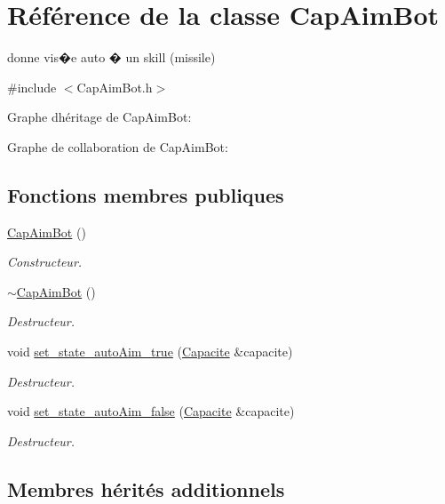 \hypertarget{class_cap_aim_bot}{}\section{Référence de la classe Cap\+Aim\+Bot}
\label{class_cap_aim_bot}


donne vis�e auto � un skill (missile)  




{\ttfamily \#include $<$Cap\+Aim\+Bot.\+h$>$}



Graphe d\textquotesingle{}héritage de Cap\+Aim\+Bot\+:


Graphe de collaboration de Cap\+Aim\+Bot\+:
\subsection*{Fonctions membres publiques}
\begin{DoxyCompactItemize}
\item 
\hyperlink{class_cap_aim_bot_ac80621e5512e382cde343c483f74c90e}{Cap\+Aim\+Bot} ()
\begin{DoxyCompactList}\small\item\em Constructeur. \end{DoxyCompactList}\item 
\hyperlink{class_cap_aim_bot_ac7deb20ca65868d6c752f137cbaea339}{$\sim$\+Cap\+Aim\+Bot} ()
\begin{DoxyCompactList}\small\item\em Destructeur. \end{DoxyCompactList}\item 
void \hyperlink{class_cap_aim_bot_a79cd2b5ebd0936e133113d5563c31396}{set\+\_\+state\+\_\+auto\+Aim\+\_\+true} (\hyperlink{class_capacite}{Capacite} \&capacite)
\begin{DoxyCompactList}\small\item\em Destructeur. \end{DoxyCompactList}\item 
void \hyperlink{class_cap_aim_bot_aaa7c76ca67faf851d511c7c46ccc8139}{set\+\_\+state\+\_\+auto\+Aim\+\_\+false} (\hyperlink{class_capacite}{Capacite} \&capacite)
\begin{DoxyCompactList}\small\item\em Destructeur. \end{DoxyCompactList}\end{DoxyCompactItemize}
\subsection*{Membres hérités additionnels}


